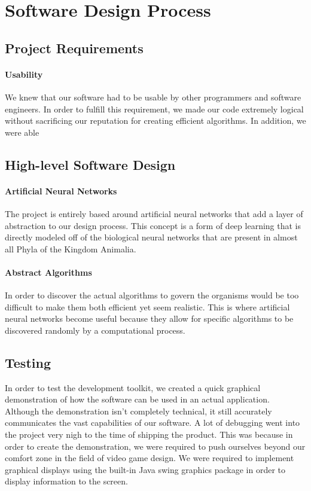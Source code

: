 \documentclass[letterpaper, 10pt]{article}
\begin{document}
\section{Software Design Process}
	\subsection{Project Requirements}
		\paragraph{Usability} We knew that our software had to be usable by other programmers and software engineers. In order to fulfill this requirement, we made our code extremely logical without sacrificing our reputation for creating efficient algorithms. In addition, we were able 
	\subsection{High-level Software Design}
		\paragraph{Artificial Neural Networks}
		The project is entirely based around artificial neural networks that add a layer of abstraction to our design process. This concept is a form of deep learning that is directly modeled off of the biological neural networks that are present in almost all Phyla of the Kingdom Animalia.
		\paragraph{Abstract Algorithms}
		In order to discover the actual algorithms to govern the organisms would be too difficult to make them both efficient yet seem realistic. This is where artificial neural networks become useful because they allow for specific algorithms to be discovered randomly by a computational process.
	\subsection{Testing}
		In order to test the development toolkit, we created a quick graphical demonstration of how the software can be used in an actual application. Although the demonstration isn't completely technical, it still accurately communicates the vast capabilities of our software. A lot of debugging went into the project very nigh to the time of shipping the product. This was because in order to create the demonstration, we were required to push ourselves beyond our comfort zone in the field of video game design. We were required to implement graphical displays using the built-in Java swing graphics package in order to display information to the screen.
\end{document}
